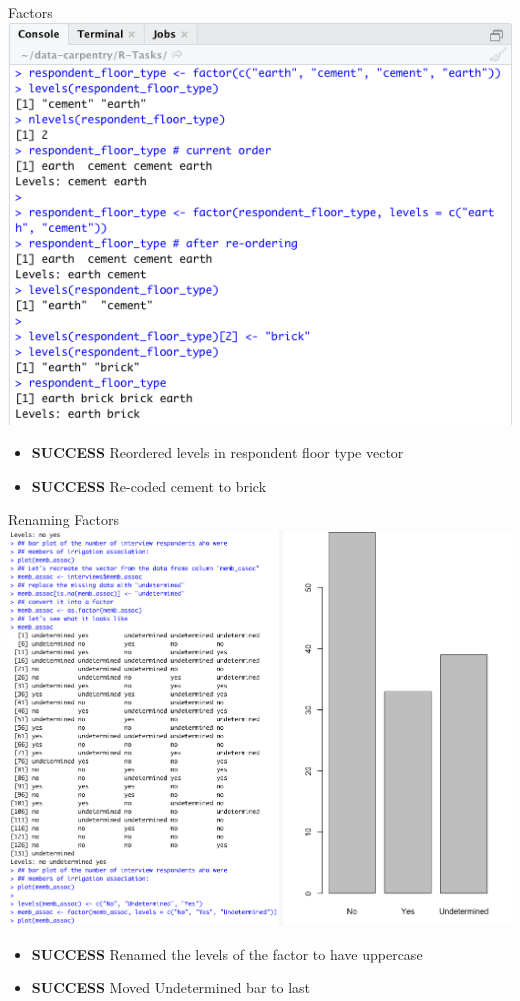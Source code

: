 \documentclass{article}
\begin{document}
Factors \\
\includegraphics[width=\textwidth]{Images/RStudio_11.png}
\begin{itemize}
\item \textbf{SUCCESS} Reordered levels in respondent floor type vector
\item \textbf{SUCCESS} Re-coded cement to brick
\end{itemize}
\clearpage
Renaming Factors \\
\includegraphics[width=\textwidth]{Images/RStudio_12.png}
\begin{itemize}
\item \textbf{SUCCESS} Renamed the levels of the factor to have uppercase 
\item \textbf{SUCCESS} Moved Undetermined bar to last
\end{itemize}
\end{document}

